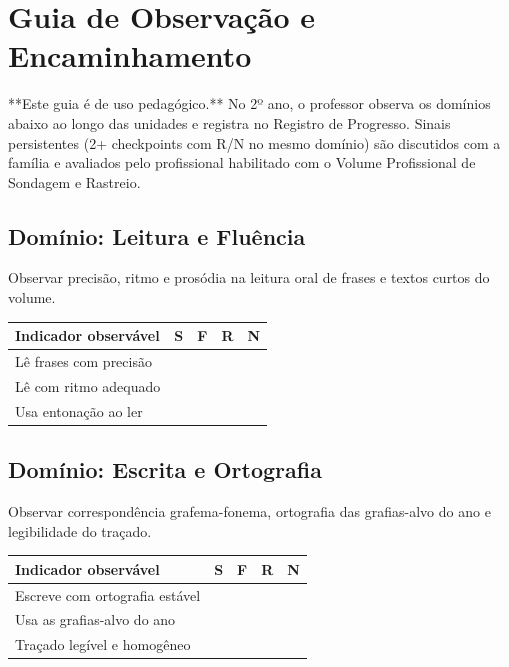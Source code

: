 
\chapter{Guia de Observação e Encaminhamento}

**Este guia é de uso pedagógico.** No 2º ano, o professor observa os domínios abaixo ao longo das unidades e registra no Registro de Progresso. Sinais persistentes (2+ checkpoints com R/N no mesmo domínio) são discutidos com a família e avaliados pelo profissional habilitado com o Volume Profissional de Sondagem e Rastreio.

\section{Domínio: Leitura e Fluência}
Observar precisão, ritmo e prosódia na leitura oral de frases e textos curtos do volume.

\begin{center}
\renewcommand{\arraystretch}{1.4}
\begin{tabular}{@{}p{9cm}cccc@{}}
\toprule
Indicador observável & S & F & R & N \\
\midrule

Lê frases com precisão & & & & \\

Lê com ritmo adequado & & & & \\

Usa entonação ao ler & & & & \\

\bottomrule\end{tabular}\end{center}

\section{Domínio: Escrita e Ortografia}
Observar correspondência grafema-fonema, ortografia das grafias-alvo do ano e legibilidade do traçado.

\begin{center}
\renewcommand{\arraystretch}{1.4}
\begin{tabular}{@{}p{9cm}cccc@{}}
\toprule
Indicador observável & S & F & R & N \\
\midrule

Escreve com ortografia estável & & & & \\

Usa as grafias-alvo do ano & & & & \\

Traçado legível e homogêneo & & & & \\

\bottomrule\end{tabular}\end{center}

